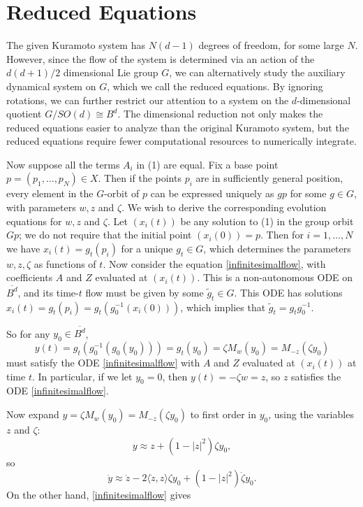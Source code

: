 \documentclass[%
 aip,
 amsmath,amssymb,
 reprint,%
]{revtex4-1}
\begin{document}
\section{\label{sec:level1}Reduced Equations}
The given Kuramoto system has $N (d-1)$ degrees of freedom, for some large $N$. However, since the flow of the system is determined via an action of the $d(d+1)/2$ dimensional Lie group $G$, we can alternatively study the auxiliary dynamical system on $G$, which we call the reduced equations. By ignoring rotations, we can further restrict our attention to a system on the $d$-dimensional quotient $G/SO(d) \cong B^d$. The dimensional reduction not only makes the reduced equations easier to analyze than the original Kuramoto system, but the reduced equations require fewer computational resources to numerically integrate.

Now suppose all the terms $A_i$ in (1) are equal.  Fix a base point $p = (p_1,  \dots, p_N) \in X$.  Then if the points  $p_i$ are in sufficiently general position, every element in the $G$-orbit of $p$ can be expressed uniquely as $g p$ for some $ g \in G$, with parameters $w, z$ and $\zeta$.  We wish to derive the corresponding evolution equations for $w, z$ and $\zeta$.  Let $(x_i(t))$ be any solution to (1) in the group orbit $Gp$; we do not require that the initial point $(x_i(0) )= p$.  Then for $i = 1, \dots, N$ we have $x_i(t) = g_t (p_i)$ for a unique $g_t \in G$, which determines the parameters $w, z, \zeta$ as functions of $t$.  Now consider the equation \eqref{infinitesimalflow}, with coefficients $A$ and $Z$ evaluated at  $(x_i(t))$.  This is a non-autonomous ODE on $\overline {B^d}$, and its time-$t$ flow must be given by some $\tilde g_t \in G$.  This ODE has solutions $x_i(t) = g_t (p_i) = g_t (g_0^{-1}( x_i(0)))$, which implies that $\tilde g_t = g_t g_0^{-1}$.

So for any $y_0 \in \overline {B^d}$,
$$
y(t) = g_t ( g_0^{-1} (g_0 (y_0)) ) = g_t (y_0) = \zeta M_w (y_0) = M_{-z}(\zeta y_0)
$$ 
must satisfy the ODE \eqref{infinitesimalflow}
with $A$ and $Z$ evaluated  at $(x_i(t))$ at time $t$.  In particular, if we let $y_0 = 0$, then $y(t) = -\zeta w = z$, so $z$ satisfies the ODE \eqref{infinitesimalflow}.

Now expand $y = \zeta M_w(y_0) = M_{-z} (\zeta y_0)$ to first order in $y_0$, using the variables $z$ and $\zeta$:
$$ 
y \approx z + (1-|z|^2) \zeta y_0,
$$
so
$$
\dot y \approx \dot z -2 \langle \dot z, z \rangle \zeta y_0 + (1-|z|^2) \dot \zeta y_0.
$$
On the other hand, \eqref{infinitesimalflow} gives
\end{document}
